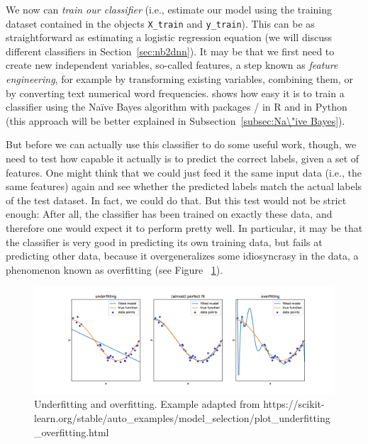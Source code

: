
We now can \emph{train our classifier} (i.e., estimate our model using the
training dataset contained in the objects \texttt{X\_train} and \texttt{y\_train}). This can be as straightforward as estimating a
logistic regression equation (we will discuss different classifiers in
Section~\ref{sec:nb2dnn}).  It may be that we first need to create new
independent variables, so-called features, a step known as
\emph{feature engineering}, for example by transforming existing
variables, combining them, or by converting text numerical word
frequencies.
 shows how easy it is to train a classifier using the Na\"ive Bayes algorithm with packages / in R and  in Python (this approach will be better explained in Subsection~\ref{subsec:Na\"ive Bayes}).


But before we can actually use this classifier to do some useful work,
though, we need to test how capable it actually is to predict the
correct labels, given a set of features. One might think that we could
just feed it the same input data (i.e., the same features) again and
see whether the predicted labels match the actual labels of the test
dataset.  In fact, we could do that.  But this test would not be
strict enough: After all, the classifier has been trained on exactly
these data, and therefore one would expect it to perform pretty well.
In particular, it may be that the classifier is very good in
predicting its own training data, but fails at predicting other data,
because it overgeneralizes some idiosyncrasy in the data, a phenomenon
known as overfitting (see Figure ~\ref{fig:roccurve}).

\begin{figure} 
\centering
\includegraphics[width=\linewidth]{figures/ch09_overfitting}
\caption{Underfitting and overfitting. Example adapted from https://scikit-learn.org/stable/auto\_examples/model\_selection/plot\_underfitting\_overfitting.html}
\label{fig:roccurve}
\end{figure}

